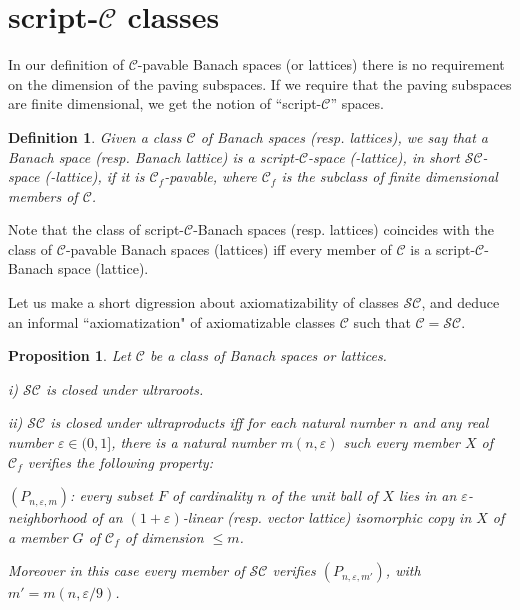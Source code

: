 \documentclass[11pt]{amsart}
\theoremstyle{plain}
\newtheorem{definition}[theorem]{Definition}
\newtheorem{proposition}[theorem]{Proposition}
\theoremstyle{remark}
\newcommand{\C}{\mathcal C}
\newcommand{\eps}{\varepsilon}
\begin{document}
\section{script-$\C$ classes}\label{script-C}

In our definition of $\C$-pavable Banach spaces (or lattices) there is no requirement on the dimension of the paving subspaces. If we require that the paving subspaces are finite dimensional, we get the notion of ``script-$\C$'' spaces.

\begin{definition}
Given a class $\C$ of Banach spaces (resp. lattices), we say that a Banach space (resp. Banach lattice) is a script-$\C$-space (-lattice), in short $\mathcal{SC}$-space (-lattice), if it is $\C_f$-pavable, where $\C_f$ is the subclass of finite dimensional members of $\C$.
\end{definition}

Note that the class of script-$\C$-Banach spaces (resp. lattices) coincides with the class of $\C$-pavable Banach spaces (lattices) iff every member of $\C$ is a script-$\C$-Banach space (lattice).

Let us make a short digression about axiomatizability of classes $\mathcal{SC}$, and deduce an informal ``axiomatization" of axiomatizable classes $\C$ such that $\C=\mathcal{SC}$. 

\begin{proposition}
\parindent=0pt
Let $\C$ be a class of Banach spaces or lattices.\smallskip

i) $\mathcal{SC}$ is closed under ultraroots.\smallskip

ii) $\mathcal{SC}$ is closed under ultraproducts iff for each natural number $n$ and any real number $\eps\in(0,1]$, there is a natural number $m(n,\eps)$ such every member $X$ of $\C_f$ verifies the following property:

\smallskip
$(P_{n,\eps,m})$: every subset $F$ of cardinality $n$  of the unit ball of $X$ lies in an $\eps$-neighborhood of an $(1+\eps)$-linear (resp. vector lattice) isomorphic copy in $X$ of a member $G$ of $\C_f$ of dimension  $\le m$.

\smallskip
Moreover in this case every member of $\mathcal{SC}$ verifies $(P_{n,\eps,m'})$, with $m'=m(n,\eps/9)$.
\end{proposition}
\end{document}
